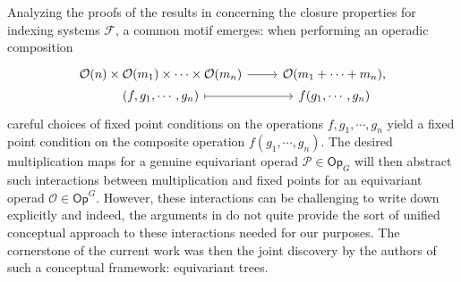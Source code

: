 \documentclass[a4paper,10pt]{article}%
\begin{document}
Analyzing the proofs of the results in 
\cite[\S 4]{BH15}
concerning the closure properties for indexing systems $\mathcal F$,
a common motif emerges:
when performing an operadic composition
\begin{equation}
\begin{tikzcd}[row sep=0]
	\O(n) \times \O(m_1) \times \cdots \times \O(m_n) \ar{r} &
	\O(m_1 + \cdots + m_n),
\\
	(f,g_1,\cdots,g_n) \ar[mapsto]{r} &
	f(g_1,\cdots,g_n)
\end{tikzcd}
\end{equation}
careful choices of fixed point conditions on the operations $f,g_1,\cdots,g_n$ 
yield a fixed point condition on the composite operation
$f(g_1,\cdots,g_n)$.
The desired multiplication maps for a genuine equivariant operad
$\mathcal{P} \in \mathsf{Op}_G$
will then abstract such interactions between multiplication and fixed points for an equivariant operad 
$\mathcal{O} \in \mathsf{Op}^G$.
However, these interactions can be challenging to write down explicitly and indeed, 
the arguments in \cite[\S 4]{BH15}
do not quite provide the sort of unified conceptual approach
to these interactions needed for our purposes.
The cornerstone of the current work was then the 
joint discovery by the authors of
such a conceptual framework: equivariant trees.
\end{document}
